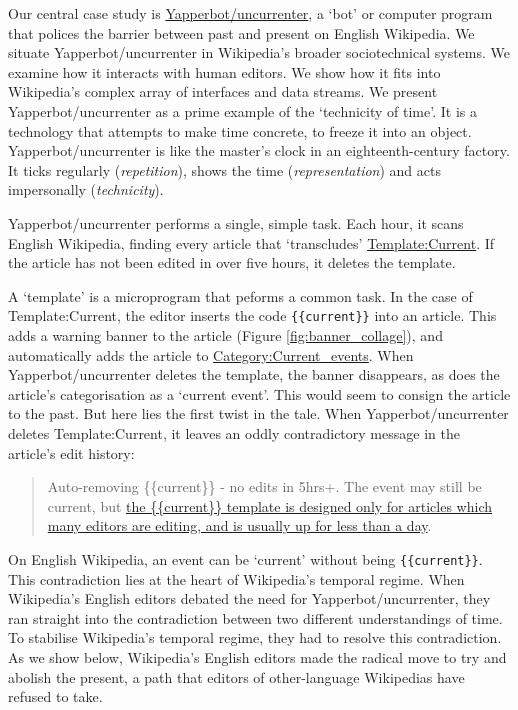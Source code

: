 \documentclass[Royal,times,sageh]{sagej}
\begin{document}
Our central case study is
\href{https://en.wikipedia.org/wiki/User:Yapperbot}{Yapperbot/uncurrenter},
a `bot' or computer program that polices the barrier between past and
present on English Wikipedia. We situate Yapperbot/uncurrenter in
Wikipedia's broader sociotechnical systems. We examine how it interacts
with human editors. We show how it fits into Wikipedia's complex array
of interfaces and data streams. We present Yapperbot/uncurrenter as a
prime example of the `technicity of time'. It is a technology that
attempts to make time concrete, to freeze it into an object.
Yapperbot/uncurrenter is like the master's clock in an
eighteenth-century factory. It ticks regularly (\emph{repetition}),
shows the time (\emph{representation}) and acts impersonally
(\emph{technicity}).

Yapperbot/uncurrenter performs a single, simple task. Each hour, it
scans English Wikipedia, finding every article that `transcludes'
\href{https://en.wikipedia.org/wiki/Template:Current}{Template:Current}.
If the article has not been edited in over five hours, it deletes the
template.

A `template' is a microprogram that peforms a common task. In the case
of Template:Current, the editor inserts the code
\texttt{\{\{current\}\}} into an article. This adds a warning banner to
the article (Figure \ref{fig:banner_collage}), and automatically adds
the article to
\href{https://en.wikipedia.org/wiki/Category:Current_events}{Category:Current\_events}.
When Yapperbot/uncurrenter deletes the template, the banner disappears,
as does the article's categorisation as a `current event'. This would
seem to consign the article to the past. But here lies the first twist
in the tale. When Yapperbot/uncurrenter deletes Template:Current, it
leaves an oddly contradictory message in the article's edit history:

\begin{quote}
Auto-removing \{\{current\}\} - no edits in 5hrs+. The event may still
be current, but
\href{https://en.wikipedia.org/wiki/Template:Current}{the
\{\{current\}\} template is designed only for articles which many
editors are editing, and is usually up for less than a day}.
\end{quote}

On English Wikipedia, an event can be `current' without being
\texttt{\{\{current\}\}}. This contradiction lies at the heart of
Wikipedia's temporal regime. When Wikipedia's English editors debated
the need for Yapperbot/uncurrenter, they ran straight into the
contradiction between two different understandings of time. To stabilise
Wikipedia's temporal regime, they had to resolve this contradiction. As
we show below, Wikipedia's English editors made the radical move to try
and abolish the present, a path that editors of other-language
Wikipedias have refused to take.
\end{document}
